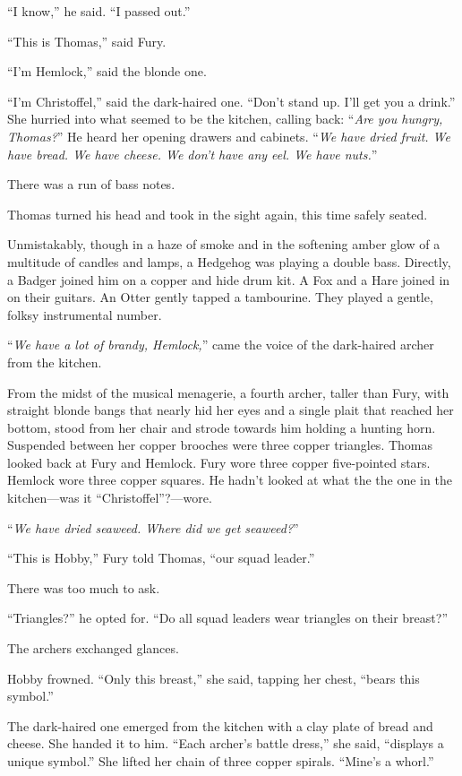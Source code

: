 \documentclass[11pt,a5paper]{article}
\begin{document}
``I know,'' he said. ``I passed out.''

``This is Thomas,'' said Fury.

``I'm Hemlock,'' said the blonde one.

``I'm Christoffel,'' said the dark-haired one. ``Don't stand up. I'll get you a drink.'' She hurried into what seemed to be the kitchen, calling back: ``\emph{Are you hungry, Thomas?}'' He heard her opening drawers and cabinets. ``\emph{We have dried fruit. We have bread. We have cheese. We don't have any eel. We have nuts.}''

There was a run of bass notes.

Thomas turned his head and took in the sight again, this time safely seated.

Unmistakably, though in a haze of smoke and in the softening amber glow of a multitude of candles and lamps, a Hedgehog was playing a double bass. Directly, a Badger joined him on a copper and hide drum kit. A Fox and a Hare joined in on their guitars. An Otter gently tapped a tambourine. They played a gentle, folksy instrumental number.

``\emph{We have a lot of brandy, Hemlock,}'' came the voice of the dark-haired archer from the kitchen.

From the midst of the musical menagerie, a fourth archer, taller than Fury, with straight blonde bangs that nearly hid her eyes and a single plait that reached her bottom, stood from her chair and strode towards him holding a hunting horn. Suspended between her copper brooches were three copper triangles. Thomas looked back at Fury and Hemlock. Fury wore three copper five-pointed stars. Hemlock wore three copper squares. He hadn't looked at what the the one in the kitchen---was it ``Christoffel''?---wore.

``\emph{We have dried seaweed. Where did we get seaweed?}''

``This is Hobby,'' Fury told Thomas, ``our squad leader.''

There was too much to ask.

``Triangles?'' he opted for. ``Do all squad leaders wear triangles on their breast?''

The archers exchanged glances.

Hobby frowned. ``Only this breast,'' she said, tapping her chest, ``bears this symbol.''

The dark-haired one emerged from the kitchen with a clay plate of bread and cheese. She handed it to him. ``Each archer's battle dress,'' she said, ``displays a unique symbol.'' She lifted her chain of three copper spirals. ``Mine's a whorl.''
\end{document}
